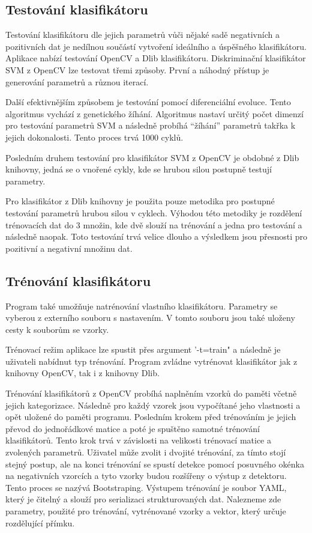 \subsection{Testování klasifikátoru}
Testování klasifikátoru dle jejich parametrů vůči nějaké sadě negativních a pozitivních dat je nedílnou součástí vytvoření ideálního a úspěšného klasifikátoru.  Aplikace nabízí testování OpenCV a Dlib klasifikátoru. Diskriminační klasifikátor SVM z OpenCV lze testovat třemi způsoby. První a náhodný přístup je generování parametrů a různou iterací.

Další efektivnějším způsobem je testování pomocí diferenciální evoluce. Tento algoritmus vychází z genetického žíhání. Algoritmus nastaví určitý počet dimenzí pro testování parametrů SVM a následně probíhá ``žíhání'' parametrů takřka k jejich dokonalosti. Tento proces trvá 1000 cyklů.

Posledním druhem testování pro klasifikátor SVM z OpenCV je obdobné z Dlib knihovny, jedná se o vnořené cykly, kde se hrubou silou postupně testují parametry. 

Pro klasifikátor z Dlib knihovny je použita pouze metodika pro postupné testování parametrů hrubou silou v cyklech. Výhodou této metodiky je rozdělení trénovacích dat do 3 množin, kde dvě slouží na trénování a jedna pro testování a následně naopak. Toto testování trvá velice dlouho a výsledkem jsou přesnosti pro pozitivní a negativní množinu dat.


\subsection{Trénování klasifikátoru}
Program také umožňuje natrénování vlastního klasifikátoru. Parametry se vyberou z externího souboru s nastavením. V tomto souboru jsou také uloženy cesty k souborům se vzorky. 

Trénovací režim aplikace lze spustit přes argument '-t=train" a následně je uživateli nabídnut typ trénování. Program zvládne vytrénovat klasifikátor jak z knihovny OpenCV, tak i z knihovny Dlib. 

Trénování klasifikátorů z OpenCV probíhá naplněním vzorků do paměti včetně jejich kategorizace. Následně pro každý vzorek jsou vypočítané jeho vlastnosti a opět uložené do paměti programu. Posledním krokem před trénováním je jejich převod do jednořádkové matice a poté je spuštěno samotné trénování klasifikátorů. Tento krok trvá v závislosti na velikosti trénovací matice a zvolených parametrů. Uživatel může zvolit i dvojité trénování, za tímto stojí stejný postup, ale na konci trénování se spustí detekce pomocí posuvného okénka na negativních vzorcích a tyto vzorky budou rozšířeny o výstup z detektoru. Tento proces se nazývá Bootstraping. Výstupem trénování je soubor YAML, který je čitelný a slouží pro serializaci strukturovaných dat. Nalezneme zde parametry, použité pro trénování, vytrénované vzorky a vektor, který určuje rozdělující přímku.

